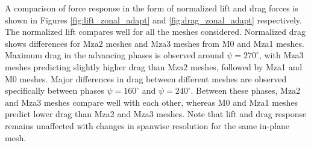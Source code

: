 
A comparison of force response in the form of normalized lift and drag forces is shown in Figures \ref{fig:lift_zonal_adapt} and \ref{fig:drag_zonal_adapt} respectively. The normalized lift compares well for all the meshes considered. Normalized drag shows differences for Mza2 meshes and Mza3 meshes from M0 and Mza1 meshes. Maximum drag in the advancing phases is observed around $\psi=270^\circ$, with Mza3 meshes predicting slightly higher drag than Mza2 meshes, followed by Mza1 and M0 meshes. Major differences in drag between different meshes are observed specifically between phases $\psi=160^\circ$ and $\psi=240^\circ$. Between these phases, Mza2 and Mza3 meshes compare well with each other, whereas M0 and Mza1 meshes predict lower drag than Mza2 and Mza3 meshes. Note that lift and drag response remains unaffected with changes in spanwise resolution for the same in-plane mesh.

